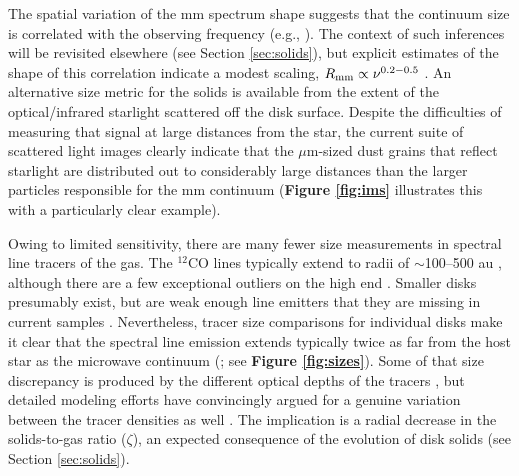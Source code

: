 \documentclass[a4paper]{ar-1col}
\begin{document}
The spatial variation of the mm spectrum shape suggests that the continuum size is correlated with the observing frequency (e.g., \citealt{perez12,lperez15,tazzari16}).  The context of such inferences will be revisited elsewhere (see Section \ref{sec:solids}), but explicit estimates of the shape of this correlation indicate a modest scaling, $R_{\rm mm} \propto \nu^{0.2-0.5}$ \citep[e.g.,][]{tripathi18}.  An alternative size metric for the solids is available from the extent of the optical/infrared starlight scattered off the disk surface.  Despite the difficulties of measuring that signal at large distances from the star, the current suite of scattered light images clearly indicate that the $\mu$m-sized dust grains that reflect starlight are distributed out to considerably large distances than the larger particles responsible for the mm continuum ({\bf Figure \ref{fig:ims}} illustrates this with a particularly clear example).  

Owing to limited sensitivity, there are many fewer size measurements in spectral line tracers of the gas.  The $^{12}$CO lines typically extend to radii of $\sim$100--500 au \citep{ansdell18}, although there are a few exceptional outliers on the high end \citep[e.g.,][]{guilloteau98,panic09}.  Smaller disks presumably exist, but are weak enough line emitters that they are missing in current samples \citep[e.g.,][]{barenfeld17_sizes}.  Nevertheless, tracer size comparisons for individual disks make it clear that the spectral line emission extends typically twice as far from the host star as the microwave continuum (\citealt{ansdell18}; see {\bf Figure \ref{fig:sizes}}).  Some of that size discrepancy is produced by the different optical depths of the tracers \citep{hughes08,trapman19}, but detailed modeling efforts have convincingly argued for a genuine variation between the tracer densities as well \citep[e.g.,][]{panic09,andrews12,degregorio-monsalvo13,rosenfeld13b,facchini17}.  The implication is a radial decrease in the solids-to-gas ratio ($\zeta$), an expected consequence of the evolution of disk solids (see Section \ref{sec:solids}).
\end{document}
